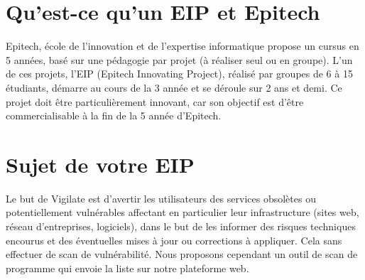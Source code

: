 \section{Qu'est-ce qu’un EIP et Epitech}
Epitech, école de l'innovation et de l'expertise informatique propose un cursus en 5 années, basé sur une pédagogie par projet (à réaliser seul ou en groupe). L'un de ces projets, l’EIP (Epitech Innovating Project), réalisé par groupes de 6 à 15 étudiants, démarre au cours de la 3\ieme{} année et se déroule sur 2 ans et demi. Ce projet doit être particulièrement innovant, car son objectif est d’être commercialisable à la fin de la 5\ieme{} année d’Epitech.

\section{Sujet de votre EIP}
Le but de Vigilate est d’avertir les utilisateurs des services obsolètes ou potentiellement vulnérables affectant en particulier leur infrastructure (sites web, réseau d'entreprises, logiciels), dans le but de les informer des risques techniques encourus et des éventuelles mises à jour ou corrections à appliquer.
Cela sans effectuer de scan de vulnérabilité.
Nous proposons cependant un outil de scan de programme qui envoie la liste sur notre plateforme web.

